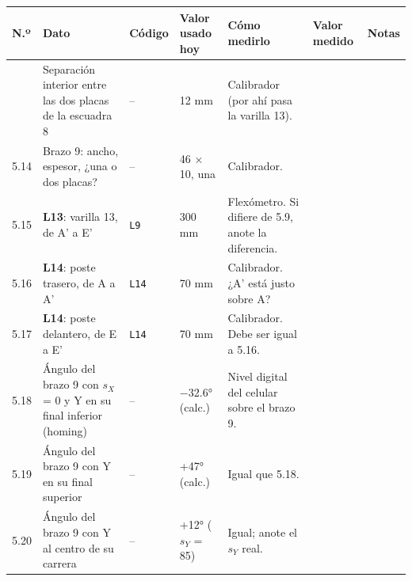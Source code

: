 \documentclass[10pt]{article}
\makeatletter
\newenvironment{medidas}{%
  \small
  \begin{longtable}{@{}L{0.9cm}L{5.0cm}L{2.3cm}L{2.7cm}L{6.4cm}>{\columncolor{fondo}}L{3.1cm}L{2.4cm}@{}}
  \toprule
  \textbf{N.º} & \textbf{Dato} & \textbf{Código} & \textbf{Valor usado hoy} & \textbf{Cómo medirlo} & \textbf{Valor medido} & \textbf{Notas}\\
  \midrule\endhead
  \bottomrule\endfoot}{\end{longtable}}
\newcommand{\cod}[1]{\texttt{\footnotesize #1}}
\makeatother
\begin{document}
\begin{medidas}
5.13 & Separación interior entre las dos placas de la escuadra 8 & -- & 12 mm & Calibrador (por ahí pasa la varilla 13). & & \\
5.14 & Brazo 9: ancho, espesor, ¿una o dos placas? & -- & 46 × 10, una & Calibrador. & & \\
5.15 & \textbf{L13}: varilla 13, de A' a E' & \cod{L9} & 300 mm & Flexómetro. Si difiere de 5.9, anote la diferencia. & & \\
5.16 & \textbf{L14}: poste trasero, de A a A' & \cod{L14} & 70 mm & Calibrador. ¿A' está justo sobre A? & & \\
5.17 & \textbf{L14}: poste delantero, de E a E' & \cod{L14} & 70 mm & Calibrador. Debe ser igual a 5.16. & & \\
5.18 & Ángulo del brazo 9 con $s_X$ = 0 y Y en su final inferior (homing) & -- & $-$32.6° (calc.) & Nivel digital del celular sobre el brazo 9. & & \\
5.19 & Ángulo del brazo 9 con Y en su final superior & -- & +47° (calc.) & Igual que 5.18. & & \\
5.20 & Ángulo del brazo 9 con Y al centro de su carrera & -- & +12° ($s_Y$ = 85) & Igual; anote el $s_Y$ real. & & \\
\end{medidas}

\end{document}

